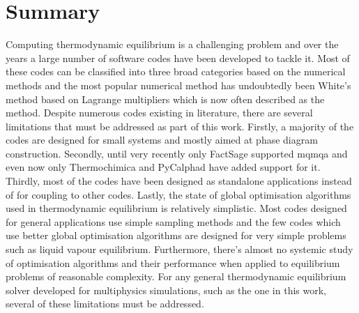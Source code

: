 \section{Summary}
    Computing thermodynamic equilibrium is a challenging problem and over the years a large number of software codes have been developed to tackle it. Most of these codes can be classified into three broad categories based on the numerical methods and the most popular numerical method has undoubtedly been White's method based on Lagrange multipliers which is now often described as the  method. Despite numerous codes existing in literature, there are several limitations that must be addressed as part of this work. Firstly, a majority of the codes are designed for small systems and mostly aimed at phase diagram construction. Secondly, until very recently only FactSage supported \gls{mqmqa} and even now only Thermochimica and PyCalphad have added support for it. Thirdly, most of the codes have been designed as standalone applications instead of for coupling to other codes. Lastly, the state of global optimisation algorithms used in thermodynamic equilibrium is relatively simplistic. Most codes designed for general applications use simple sampling methods and the few codes which use better global optimisation algorithms are designed for very simple problems such as liquid vapour equilibrium. Furthermore, there's almost no systemic study of optimisation algorithms and their performance when applied to equilibrium problems of reasonable complexity. For any general thermodynamic equilibrium solver developed for multiphysics simulations, such as the one in this work, several of these limitations must be addressed. 